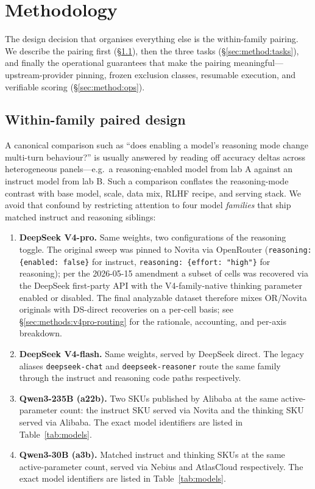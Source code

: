 \section{Methodology}
\label{sec:method}

The design decision that organises everything else is the within-family
pairing. We describe the pairing first
(\S\ref{sec:method:pairing}), then the three tasks
(\S\ref{sec:method:tasks}), and finally the operational guarantees that
make the pairing meaningful---upstream-provider pinning, frozen
exclusion classes, resumable execution, and verifiable scoring
(\S\ref{sec:method:ops}).

\subsection{Within-family paired design}
\label{sec:method:pairing}

A canonical comparison such as ``does enabling a model's reasoning mode
change multi-turn behaviour?'' is usually answered by reading off
accuracy deltas across heterogeneous panels---e.g.\ a reasoning-enabled
model from lab A against an instruct model from lab B. Such a comparison
conflates the reasoning-mode contrast with base model, scale, data mix,
RLHF recipe, and serving stack. We avoid that confound by restricting attention to four
model \emph{families} that ship matched instruct and reasoning siblings:

\begin{enumerate}
  \item \textbf{DeepSeek V4-pro.} Same weights, two
        configurations of the reasoning toggle. The original sweep
        was pinned to Novita via OpenRouter
        (\texttt{reasoning: \{enabled: false\}} for instruct,
        \texttt{reasoning: \{effort: "high"\}} for reasoning); per the
        2026-05-15 amendment a subset of cells was recovered via the
        DeepSeek first-party API with the V4-family-native thinking
        parameter enabled or disabled.
        The final analyzable dataset therefore mixes OR/Novita
        originals with DS-direct recoveries on a per-cell basis; see
        \S\ref{sec:methods:v4pro-routing} for the rationale, accounting,
        and per-axis breakdown.
  \item \textbf{DeepSeek V4-flash.} Same weights, served by DeepSeek
        direct. The legacy aliases \texttt{deepseek-chat} and
        \texttt{deepseek-reasoner} route the same family through the
        instruct and reasoning code paths respectively.
  \item \textbf{Qwen3-235B (a22b).} Two SKUs published by Alibaba at the
        same active-parameter count: the instruct SKU served via Novita
        and the thinking SKU served via Alibaba. The exact model
        identifiers are listed in Table~\ref{tab:models}.
  \item \textbf{Qwen3-30B (a3b).} Matched instruct and thinking SKUs at
        the same active-parameter count, served via Nebius and
        AtlasCloud respectively. The exact model identifiers are listed
        in Table~\ref{tab:models}.
\end{enumerate}

